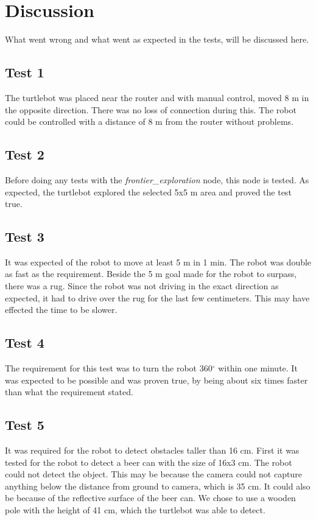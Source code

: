 \chapter{Discussion}
What went wrong and what went as expected in the tests, will be discussed here.

\section{Test 1}
The turtlebot was placed near the router and with manual control, moved 8 m in the opposite direction. There was no loss of connection during this. The robot could be controlled with a distance of 8 m from the router without problems.

\section{Test 2}
Before doing any tests with the \textit{frontier\_exploration} node, this node is tested. As expected, the turtlebot explored the selected 5x5 m area and proved the test true.

\section{Test 3}
It was expected of the robot to move at least 5 m in 1 min. The robot was double as fast as the requirement. Beside the 5 m goal made for the robot to surpass, there was a rug. Since the robot was not driving in the exact direction as expected, it had to drive over the rug for the last few centimeters. This may have effected the time to be slower.

\section{Test 4}
The requirement for this test was to turn the robot 360${^\circ}$ within one minute. It was expected to be possible and was proven true, by being about six times faster than what the requirement stated.

\section{Test 5}\label{ch:discussionTest5}
It was required for the robot to detect obstacles taller than 16 cm. First it was tested for the robot to detect a beer can with the size of 16x3 cm. The robot could not detect the object. This may be because the camera could not capture anything below the distance from ground to camera, which is 35 cm. It could also be because of the reflective surface of the beer can. We chose to use a wooden pole with the height of 41 cm, which the turtlebot was able to detect.

